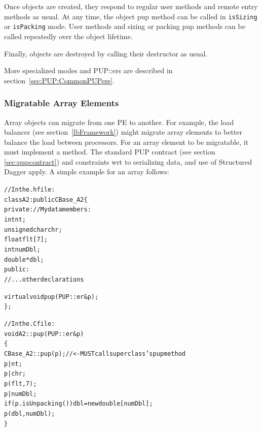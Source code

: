 Once objects are created, they respond to regular user methods
and remote entry methods as usual.  At any time, the object 
pup method can be called in \verb.isSizing. or \verb.isPacking.
mode.  User methods and sizing or packing pup methods can be called
repeatedly over the object lifetime.

Finally, objects are destroyed by calling their destructor
as usual.

More specialized modes and PUP::ers are described in section~\ref{sec:PUP:CommonPUPers}. 

\subsubsection{Migratable Array Elements}

\label{arraymigratable}
Array objects can migrate from one PE to another.  For
example, the load balancer (see section~\ref{lbFramework}) might
migrate array elements to better balance the load between processors.
For an array element to be migratable, it must implement a 
method.  The standard PUP contract (see section \ref{sec:pupcontract})
and constraints wrt to serializing data, and use of Structured Dagger apply.  A simple example for an array follows:

\begin{alltt}
//In the .h file:
class A2 : public CBase\_A2 \{
private: //My data members:
    int nt;
    unsigned char chr;
    float flt[7];
    int numDbl;
    double *dbl;
public:	
    //...other declarations

    virtual void pup(PUP::er \&p);
\};

//In the .C file:
void A2::pup(PUP::er \&p)
\{
    CBase\_A2::pup(p); //<- MUST call superclass's pup method
    p|nt;
    p|chr;
    p(flt,7);
    p|numDbl;
    if (p.isUnpacking()) dbl=new double[numDbl];
    p(dbl,numDbl);
\}
\end{alltt}




